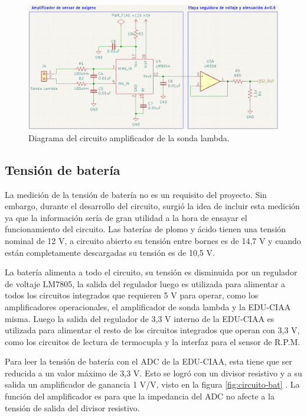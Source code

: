 \begin{figure}[htpb]
\centering
\includegraphics[width=\textwidth]{./Figures/ampli-o2.png}
\caption{Diagrama del circuito amplificador de la sonda lambda.}
\label{fig:circuito-o2}
\end{figure}

\subsection{Tensión de batería}

La medición de la tensión de batería no es un requisito del proyecto. Sin embargo, durante el desarrollo del circuito, surgió la idea de incluir esta medición ya que la información sería de gran utilidad a la hora de ensayar el funcionamiento del circuito.
Las baterías de plomo y ácido tienen una tensión nominal de 12 V, a circuito abierto su tensión entre bornes es de 14,7 V y cuando están completamente descargadas su tensión es de 10,5 V.

La batería alimenta a todo el circuito, su tensión es disminuida por un regulador de voltaje LM7805, la salida del regulador luego es utilizada para alimentar a todos los circuitos integrados que requieren 5 V para operar, como los amplificadores operacionales, el amplificador de sonda lambda y la EDU-CIAA misma. Luego la salida del regulador de 3,3 V interno de la EDU-CIAA es utilizada para alimentar el resto de los circuitos integrados que operan con 3,3 V, como los circuitos de lectura de termocupla y la interfaz para el sensor de R.P.M.

Para leer la tensión de batería con el ADC de la EDU-CIAA, esta tiene que ser reducida a un valor máximo de 3,3 V. Esto se logró con un divisor resistivo y a su salida un amplificador de ganancia 1 V/V, visto en la figura \ref{fig:circuito-bat} . La función del amplificador es para que la impedancia del ADC no afecte a la tensión de salida del divisor resistivo.

